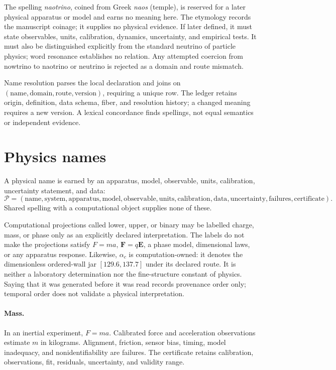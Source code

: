 The spelling \emph{naotrino}, coined from Greek \emph{naos} (temple), is reserved for a later physical apparatus or
model and earns no meaning here.  The etymology records the manuscript coinage; it supplies no physical evidence.  If later
defined, it must state observables, units, calibration, dynamics, uncertainty, and empirical tests.  It must also be
distinguished explicitly from the standard neutrino of particle physics; word resonance establishes no relation.
Any attempted coercion from nowtrino to naotrino or neutrino is rejected as a domain and route mismatch.

Name resolution parses the local declaration and joins on
\((\text{name},\text{domain},\text{route},\text{version})\), requiring a unique row.  The ledger retains origin,
definition, data schema, fiber, and resolution history; a changed meaning requires a new version.  A lexical
concordance finds spellings, not equal semantics or independent evidence.

\section{Physics names}

A physical name is earned by an apparatus, model, observable, units, calibration, uncertainty statement, and data:
\[
\mathcal P=(\text{name},\text{system},\text{apparatus},\text{model},\text{observable},
\text{units},\text{calibration},\text{data},\text{uncertainty},\text{failures},\text{certificate}).
\]
Shared spelling with a computational object supplies none of these.

Computational projections called lower, upper, or binary may be labelled charge, mass, or phase only as an explicitly
declared interpretation.  The labels do not make the projections satisfy \(F=ma\), \(\mathbf F=q\mathbf E\), a phase
model, dimensional laws, or any apparatus response.  Likewise, \(\alpha_c\) is computation-owned: it denotes the
dimensionless ordered-wall jar \([129.6,137.7]\) under its declared route.  It is neither a laboratory determination
nor the fine-structure constant of physics.  Saying that it was generated before it was read records provenance order
only; temporal order does not validate a physical interpretation.

\paragraph{Mass.} In an inertial experiment, \(F=ma\).  Calibrated force and acceleration observations estimate
\(m\) in kilograms.  Alignment, friction, sensor bias, timing, model inadequacy, and nonidentifiability are failures.
The certificate retains calibration, observations, fit, residuals, uncertainty, and validity range.

